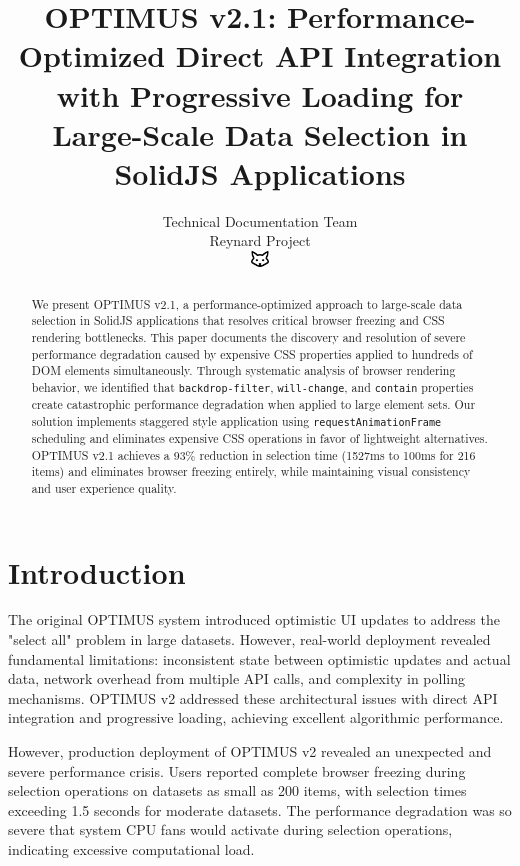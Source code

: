 \documentclass[10pt]{article}
\begin{document}
\title{OPTIMUS v2.1: Performance-Optimized Direct API Integration with Progressive Loading for Large-Scale Data Selection in SolidJS Applications}

\author{Technical Documentation Team\\
Reynard Project\\
\includegraphics[width=0.5cm]{favicon.pdf}}

\maketitle

\begin{abstract}
We present OPTIMUS v2.1, a performance-optimized approach to large-scale data selection in SolidJS applications that resolves critical browser freezing and CSS rendering bottlenecks. This paper documents the discovery and resolution of severe performance degradation caused by expensive CSS properties applied to hundreds of DOM elements simultaneously. Through systematic analysis of browser rendering behavior, we identified that \texttt{backdrop-filter}, \texttt{will-change}, and \texttt{contain} properties create catastrophic performance degradation when applied to large element sets. Our solution implements staggered style application using \texttt{requestAnimationFrame} scheduling and eliminates expensive CSS operations in favor of lightweight alternatives. OPTIMUS v2.1 achieves a 93\% reduction in selection time (1527ms to 100ms for 216 items) and eliminates browser freezing entirely, while maintaining visual consistency and user experience quality.
\end{abstract}

\section{Introduction}

The original OPTIMUS system introduced optimistic UI updates to address the "select all" problem in large datasets. However, real-world deployment revealed fundamental limitations: inconsistent state between optimistic updates and actual data, network overhead from multiple API calls, and complexity in polling mechanisms. OPTIMUS v2 addressed these architectural issues with direct API integration and progressive loading, achieving excellent algorithmic performance.

However, production deployment of OPTIMUS v2 revealed an unexpected and severe performance crisis. Users reported complete browser freezing during selection operations on datasets as small as 200 items, with selection times exceeding 1.5 seconds for moderate datasets. The performance degradation was so severe that system CPU fans would activate during selection operations, indicating excessive computational load.
\end{document}
